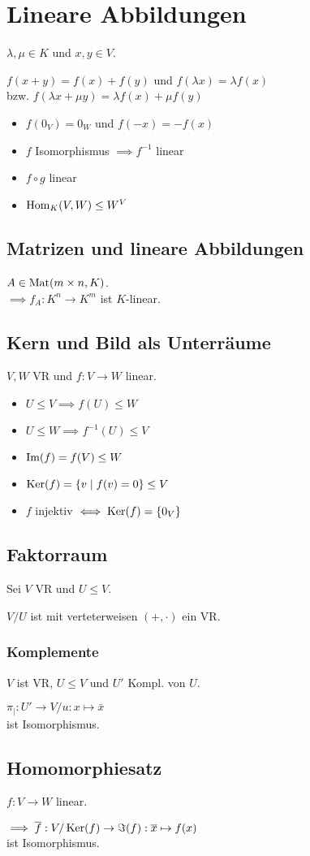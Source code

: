 \section*{Lineare Abbildungen}
$\lambda,\mu \in K$ und $x,y \in V$.

$f(x+y)=f(x)+f(y)$ und $f(\lambda x) = \lambda f(x)$ \\
bzw. $f(\lambda x + \mu y) = \lambda f(x) + \mu f (y)$

\begin{itemize}
	\item $f(0_V)=0_W$ und $f(-x) = -f(x)$
	\item $f$ Isomorphismus $\implies f^{-1}$ linear
	\item $f \circ g$ linear
	\item $\operatorname{Hom}_K(V,W) \le W^V$
\end{itemize}

\subsection*{Matrizen und lineare Abbildungen}
$A\in\operatorname{Mat}(m\times n, K)$.\\
$\implies f_A: K^n\to K^m$ ist $K$-linear.

\subsection*{Kern und Bild als Unterräume}
$V,W$ VR und $f:V\to W$ linear.
\begin{itemize}
	\item $U\le V \implies f(U)\le W$
	\item $U\le W \implies f^{-1}(U) \le V$
	\item $\operatorname{Im}(f)=f(V)\le W$
	\item $\operatorname{Ker}(f) = \{v \mid f(v)=0\} \le V$
	\item $f$ injektiv $\iff \operatorname{Ker}(f)=\{0_V\}$
\end{itemize}

\subsection*{Faktorraum}
Sei $V$ VR und $U \le V$.

$V/U$ ist mit verteterweisen $(+,\cdot)$ ein VR.

\subsubsection*{Komplemente}
$V$ ist VR, $U \le V$ und $U'$ Kompl. von $U$.

$\pi_{\mid}: U' \to V/u: x \mapsto \bar x$ \\
ist Isomorphismus.

\subsection*{Homomorphiesatz}
$f: V \to W$ linear.

$\implies \overline f: V/\operatorname{Ker}(f) \to \Im(f): \overline x \mapsto f(x)$ \\
ist Isomorphismus.
